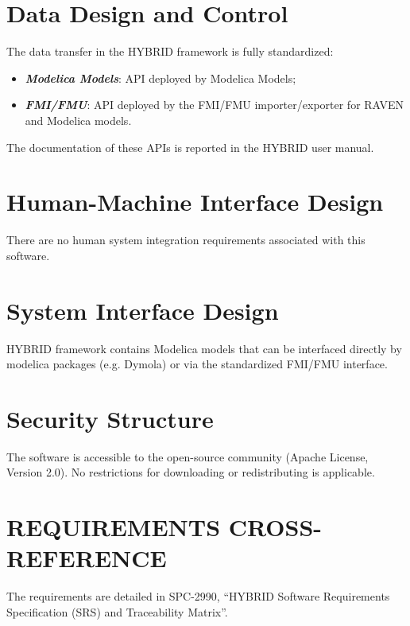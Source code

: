 \section{Data Design and Control}
The data transfer in the HYBRID framework is fully standardized:
\begin{itemize}
  \item  \textbf{\textit{Modelica Models}}: API deployed by Modelica Models;
  \item \textbf{\textit{FMI/FMU}}: API deployed by the FMI/FMU importer/exporter for RAVEN and Modelica models.
\end{itemize}
The documentation of these APIs is reported in the HYBRID user manual.

\section{Human-Machine Interface Design} 
 There are no human system integration requirements associated with this software.
 \section{System Interface Design} 
HYBRID framework contains Modelica models that can be interfaced directly by modelica packages (e.g. Dymola) or
via the standardized FMI/FMU interface.

 \section{Security Structure} 
The software is accessible to the open-source community (Apache License, Version 2.0). No restrictions for downloading or redistributing is applicable.

 \section{REQUIREMENTS CROSS-REFERENCE} 
The requirements are detailed in SPC-2990, ``HYBRID Software Requirements Specification (SRS) and Traceability Matrix''.
